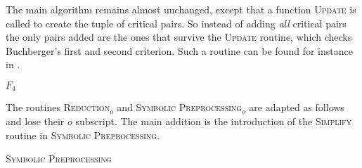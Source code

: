 The main algorithm remains almost unchanged, except that a function \textsc{Update} is called to create the tuple of critical pairs. So instead of adding \emph{all} critical pairs the only pairs added are the ones that survive the \textsc{Update} routine, which checks Buchberger's first and second criterion. Such a routine can be found for instance in \cite{Becker1991}.

\begin{algorithm}

\caption{$F_{4}$}
\label{alg:f4}
\end{algorithm}

The routines \textsc{Reduction$_o$} and \textsc{Symbolic Preprocessing$_o$} are adapted as follows and lose their $o$ subscript. The main addition is the introduction of the \textsc{Simplify} routine in \textsc{Symbolic Preprocessing}.

\begin{algorithm}[ht]

\caption{\textsc{Symbolic Preprocessing}} 
\label{alg:symbolic_preprocessing}
\end{algorithm}

